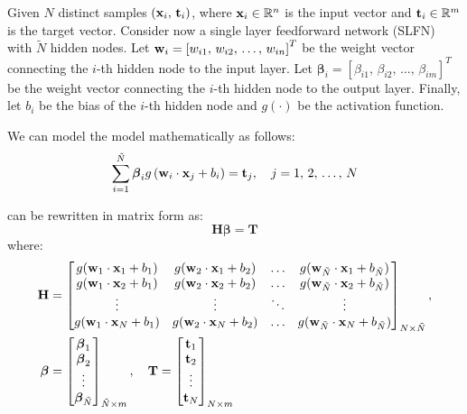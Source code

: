 Given $N$ distinct samples $\left( \textbf x_i,\, \textbf t_i \right)$,
where $\textbf x_i \in \mathbb{R}^n$ is the input vector and $\textbf t_i \in \mathbb{R}^m$
is the target vector. Consider now a single layer feedforward network (SLFN)
with $\tilde{N}$ hidden nodes. Let $\textbf w_i = \left[ w_{i1},\,w_{i2},\,\dots,\,w_{in} \right]^T$
be the weight vector connecting the $i$-th hidden node to the input layer.
Let $\boldsymbol\beta_i = \left[ \beta_{i1},\,\beta_{i2},\,\dots,\,\beta_{im} \right]^T$ be
the weight vector connecting the $i$-th hidden node to the output layer. Finally, let
$b_i$ be the bias of the $i$-th hidden node and $g(\cdot)$ be the activation function.

We can model the model mathematically as follows:
\begin{equation}%
    \label{eq:slfn}
    \sum_{i=1}^{\tilde{N}} \boldsymbol\beta_{i} g\left( \textbf w_i \cdot \textbf x_j + b_i \right) = \textbf t_j, \quad j = 1,\,2,\,\dots,\,N
\end{equation}

 can be rewritten in matrix form as:
\begin{equation}
    \textbf{H}\boldsymbol\beta = \textbf{T}
\end{equation}
where:
\begin{align}
    \textbf H &= \begin{bmatrix}
        g(\textbf w_1 \cdot \textbf x_1 + b_1) & g(\textbf w_2 \cdot \textbf x_1 + b_2) & \dots & g(\textbf w_{\tilde{N}} \cdot \textbf x_1 + b_{\tilde{N}}) \\
        g(\textbf w_1 \cdot \textbf x_2 + b_1) & g(\textbf w_2 \cdot \textbf x_2 + b_2) & \dots & g(\textbf w_{\tilde{N}} \cdot \textbf x_2 + b_{\tilde{N}}) \\
        \vdots                                 & \vdots                                 & \ddots & \vdots                                 \\
        g(\textbf w_1 \cdot \textbf x_N + b_1) & g(\textbf w_2 \cdot \textbf x_N + b_2) & \dots & g(\textbf w_{\tilde{N}} \cdot \textbf x_N + b_{\tilde{N}})
    \end{bmatrix}_{N \times \tilde{N}}, \\
    \boldsymbol\beta &= \begin{bmatrix}
        \boldsymbol\beta_1 \\
        \boldsymbol\beta_2 \\
        \vdots             \\
        \boldsymbol\beta_{\tilde{N}}
    \end{bmatrix}_{\tilde{N} \times m}, \quad
    \textbf T = \begin{bmatrix}
        \textbf t_1 \\
        \textbf t_2 \\
        \vdots      \\
        \textbf t_N
    \end{bmatrix}_{N \times m}
\end{align}

